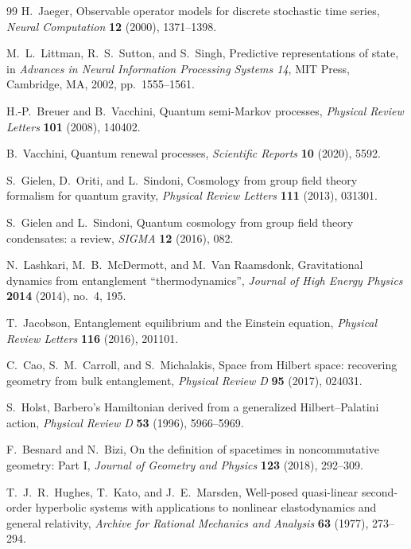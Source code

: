 \documentclass[11pt]{article}
\numberwithin{equation}{section}
\theoremstyle{definition}
\theoremstyle{remark}
\begin{document}
\begin{thebibliography}{99}
H.~Jaeger,
\newblock Observable operator models for discrete stochastic time series,
\newblock \emph{Neural Computation} \textbf{12} (2000), 1371--1398.

M.~L.~Littman, R.~S.~Sutton, and S.~Singh,
\newblock Predictive representations of state,
\newblock in \emph{Advances in Neural Information Processing Systems 14},
MIT Press, Cambridge, MA, 2002, pp.~1555--1561.

H.-P.~Breuer and B.~Vacchini,
\newblock Quantum semi-Markov processes,
\newblock \emph{Physical Review Letters} \textbf{101} (2008), 140402.

B.~Vacchini,
\newblock Quantum renewal processes,
\newblock \emph{Scientific Reports} \textbf{10} (2020), 5592.

S.~Gielen, D.~Oriti, and L.~Sindoni,
\newblock Cosmology from group field theory formalism for quantum gravity,
\newblock \emph{Physical Review Letters} \textbf{111} (2013), 031301.

S.~Gielen and L.~Sindoni,
\newblock Quantum cosmology from group field theory condensates: a review,
\newblock \emph{SIGMA} \textbf{12} (2016), 082.

N.~Lashkari, M.~B.~McDermott, and M.~Van Raamsdonk,
\newblock Gravitational dynamics from entanglement ``thermodynamics'',
\newblock \emph{Journal of High Energy Physics} \textbf{2014} (2014), no.~4,
195.

T.~Jacobson,
\newblock Entanglement equilibrium and the Einstein equation,
\newblock \emph{Physical Review Letters} \textbf{116} (2016), 201101.

C.~Cao, S.~M.~Carroll, and S.~Michalakis,
\newblock Space from Hilbert space: recovering geometry from bulk entanglement,
\newblock \emph{Physical Review D} \textbf{95} (2017), 024031.

S.~Holst,
\newblock Barbero's Hamiltonian derived from a generalized Hilbert--Palatini
action,
\newblock \emph{Physical Review D} \textbf{53} (1996), 5966--5969.

F.~Besnard and N.~Bizi,
\newblock On the definition of spacetimes in noncommutative geometry: Part I,
\newblock \emph{Journal of Geometry and Physics} \textbf{123} (2018), 292--309.

T.~J.~R.~Hughes, T.~Kato, and J.~E.~Marsden,
\newblock Well-posed quasi-linear second-order hyperbolic systems with
applications to nonlinear elastodynamics and general relativity,
\newblock \emph{Archive for Rational Mechanics and Analysis} \textbf{63}
(1977), 273--294.


\end{thebibliography}
\end{document}
